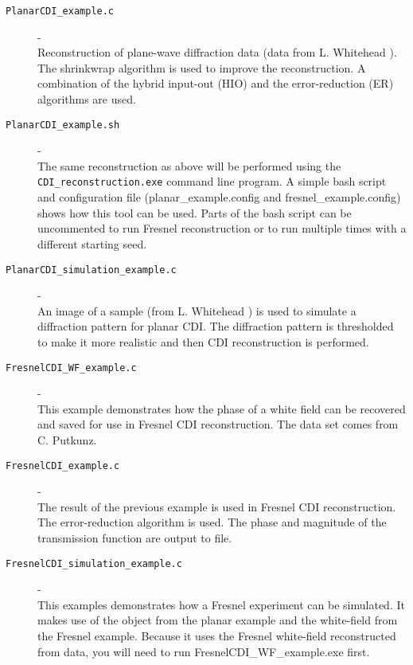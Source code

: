 \documentclass[]{nadia}
\begin{document}
\begin{description}

\item[{\tt PlanarCDI\_example.c}] - \\ Reconstruction of plane-wave diffraction
  data (data from L. Whitehead \cite{Whitehead:08}). The shrinkwrap algorithm is
  used to improve the reconstruction. A combination of the hybrid
  input-out (HIO) and the error-reduction (ER) algorithms are used.

\item[{\tt PlanarCDI\_example.sh}] - \\ The same reconstruction as
  above will be performed using the {\tt CDI\_reconstruction.exe}
  command line program. A simple bash script and configuration file
  (planar\_example.config and fresnel\_example.config) shows how this
  tool can be used. Parts of the bash script can be uncommented to run
  Fresnel reconstruction or to run multiple times with a different
  starting seed.

\item[{\tt PlanarCDI\_simulation\_example.c}] - \\ An image of a sample (from
  L. Whitehead \cite{}) is used to simulate a diffraction pattern for
  planar CDI. The diffraction pattern is thresholded to make it more
  realistic and then CDI reconstruction is performed.

\item[{\tt FresnelCDI\_WF\_example.c }] - \\ This example demonstrates
  how the phase of a white field can be recovered and saved for use in
  Fresnel CDI reconstruction. The data set comes from C. Putkunz.

\item[{\tt FresnelCDI\_example.c }]- \\ The result of the previous
  example is used in Fresnel CDI reconstruction. The error-reduction
  algorithm is used. The phase and magnitude of the transmission
  function are output to file.

\item[{\tt FresnelCDI\_simulation\_example.c }]- \\ This examples
  demonstrates how a Fresnel experiment can be simulated. It makes use
  of the object from the planar example and the white-field from the
  Fresnel example. Because it uses the Fresnel white-field
  reconstructed from data, you will need to run
  FresnelCDI\_WF\_example.exe first.


\end{description}
\end{document}
